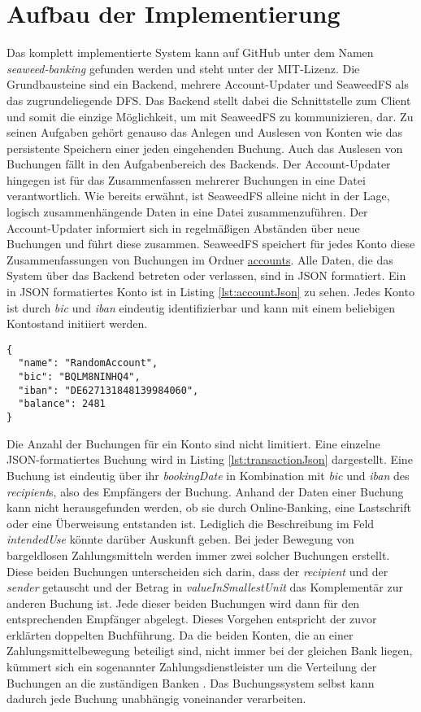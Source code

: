 \documentclass[12pt,oneside,a4paper,parskip]{scrbook}
\begin{document}
\section{Aufbau der Implementierung}
Das komplett implementierte System kann auf GitHub unter dem Namen \textit{seaweed-banking} gefunden werden und steht unter der MIT-Lizenz. Die Grundbausteine sind ein Backend, mehrere Account-Updater und SeaweedFS als das zugrundeliegende DFS. Das Backend stellt dabei die Schnittstelle zum Client und somit die einzige Möglichkeit, um mit SeaweedFS zu kommunizieren, dar. Zu seinen Aufgaben gehört genauso das Anlegen und Auslesen von Konten wie das persistente Speichern einer jeden eingehenden Buchung. Auch das Auslesen von Buchungen fällt in den Aufgabenbereich des Backends. Der Account-Updater hingegen ist für das Zusammenfassen mehrerer Buchungen in eine Datei verantwortlich. Wie bereits erwähnt, ist SeaweedFS alleine nicht in der Lage, logisch zusammenhängende Daten in eine Datei zusammenzuführen. Der Account-Updater informiert sich in regelmäßigen Abständen über neue Buchungen und führt diese zusammen. SeaweedFS speichert für jedes Konto diese Zusammenfassungen von Buchungen im Ordner \url{accounts}. Alle Daten, die das System über das Backend betreten oder verlassen, sind in JSON formatiert. Ein in JSON formatiertes Konto ist in Listing \ref{lst:accountJson} zu sehen. Jedes Konto ist durch \textit{bic} und \textit{iban} eindeutig identifizierbar und kann mit einem beliebigen Kontostand initiiert werden.

\begin{lstlisting}[label=lst:accountJson,
           language={},
           firstnumber=1,
           caption=Kontoobjekt im JSON-Format.]           
{
  "name": "RandomAccount",
  "bic": "BQLM8NINHQ4",
  "iban": "DE627131848139984060",
  "balance": 2481
}
\end{lstlisting}
Die Anzahl der Buchungen für ein Konto sind nicht limitiert. Eine einzelne JSON-formatiertes Buchung wird in Listing \ref{lst:transactionJson} dargestellt. Eine Buchung ist eindeutig über ihr \textit{bookingDate} in Kombination mit \textit{bic} und \textit{iban} des \textit{recipient}s, also des Empfängers der Buchung. Anhand der Daten einer Buchung kann nicht herausgefunden werden, ob sie durch Online-Banking, eine Lastschrift oder eine Überweisung entstanden ist. Lediglich die Beschreibung im Feld \textit{intendedUse} könnte darüber Auskunft geben. Bei jeder Bewegung von bargeldlosen Zahlungsmitteln werden immer zwei solcher Buchungen erstellt. Diese beiden Buchungen unterscheiden sich darin, dass der \textit{recipient} und der \textit{sender} getauscht und der Betrag in \textit{valueInSmallestUnit} das Komplementär zur anderen Buchung ist. Jede dieser beiden Buchungen wird dann für den entsprechenden Empfänger abgelegt. Dieses Vorgehen entspricht der zuvor erklärten doppelten Buchführung. Da die beiden Konten, die an einer Zahlungsmittelbewegung beteiligt sind, nicht immer bei der gleichen Bank liegen, kümmert sich ein sogenannter Zahlungsdienstleister um die Verteilung der Buchungen an die zuständigen Banken \cite{wiki:zahlungsdienstleister}. Das Buchungssystem selbst kann dadurch jede Buchung unabhängig voneinander verarbeiten.
\end{document}
